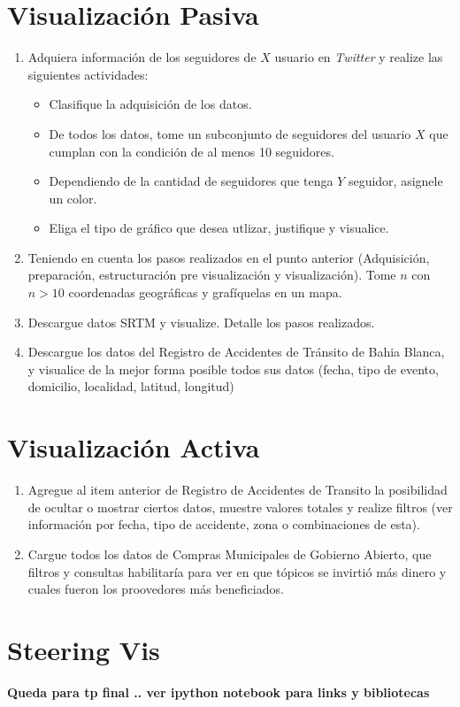 \documentclass{article}
\begin{document}
\section{Visualización Pasiva}
\begin{enumerate}
\item Adquiera información de los seguidores de $X$ usuario en \emph{Twitter} y realize las siguientes actividades:
\begin{itemize}
	\item Clasifique la adquisición de los datos.
	\item De todos los datos, tome un subconjunto de seguidores del usuario $X$ que cumplan con la condición de al menos 10 seguidores.
	\item Dependiendo de la cantidad de seguidores que tenga $Y$ seguidor, asignele un color.
	\item Eliga el tipo de gráfico que desea utlizar, justifique y visualice.
\end{itemize}
\item Teniendo en cuenta los pasos realizados en el punto anterior (Adquisición, preparación, estructuración pre visualización y visualización). Tome $n$ con $n > 10$  coordenadas geográficas y grafíquelas en un mapa.
\item Descargue datos SRTM y visualize. Detalle los pasos realizados. 
\item Descargue los datos del Registro de Accidentes de Tránsito de Bahia Blanca, y visualice de la mejor forma posible todos sus datos (fecha, tipo de evento, domicilio, localidad, latitud, longitud)
\end{enumerate}

\section{Visualización Activa}

\begin{enumerate}
	\item Agregue al item anterior de Registro de Accidentes de Transito la posibilidad de ocultar o mostrar ciertos datos, muestre valores totales y realize filtros (ver información por fecha, tipo de accidente, zona o combinaciones de esta).
	\item Cargue todos los datos de Compras Municipales de Gobierno Abierto, que filtros y consultas habilitaría para ver en que tópicos se invirtió más dinero y cuales fueron los proovedores más beneficiados.
\end{enumerate}

\section{Steering Vis}
\textbf{Queda para tp final .. ver ipython notebook para links y bibliotecas}
\end{document}

